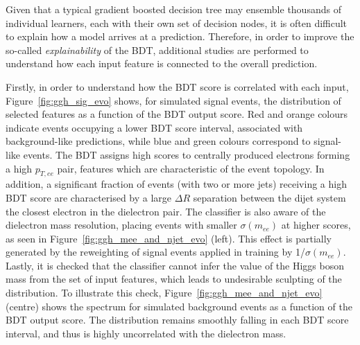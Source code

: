 Given that a typical gradient boosted decision tree may ensemble thousands of individual learners, each with their own set of decision nodes, it is often difficult to explain how a model arrives at a prediction. Therefore, in order to improve the so-called \textit{explainability} of the \ggH BDT, additional studies are performed to understand how each input feature is connected to the overall prediction.

Firstly, in order to understand how the \ggH BDT score is correlated with each input, Figure~\ref{fig:ggh_sig_evo} shows, for simulated \ggH signal events, the distribution of selected features as a function of the BDT output score. Red and orange colours indicate events occupying a lower BDT score interval, associated with background-like predictions, while blue and green colours correspond to signal-like events.
The BDT assigns high scores to centrally produced electrons forming a high $p_{T,ee}$ pair, features which are characteristic of the \ggH event topology.
In addition, a significant fraction of events (with two or more jets) receiving a high BDT score are characterised by a large $\Delta R$ separation between the dijet system the closest electron in the dielectron pair.
The classifier is also aware of the dielectron mass resolution, placing events with 
smaller $\sigma(m_{ee})$ at higher scores, as seen in Figure~\ref{fig:ggh_mee_and_njet_evo} (left). This effect is partially generated by the reweighting of signal events applied in training by 1/$\sigma(m_{ee})$.
Lastly, it is checked that the classifier cannot infer the value of the Higgs boson mass from the set of input features, which leads to undesirable sculpting of the \mee distribution. To illustrate this check, Figure~\ref{fig:ggh_mee_and_njet_evo} (centre) shows the \mee spectrum for simulated background events as a function of the BDT output score. The distribution remains smoothly falling in each BDT score interval, and thus is highly uncorrelated with the dielectron mass.


